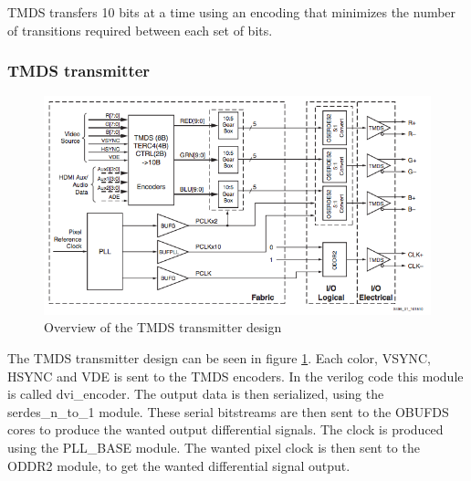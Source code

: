 TMDS transfers 10 bits at a time using an encoding that minimizes the number of transitions required between each set of bits.

\subsubsection{TMDS transmitter}
\begin{figure}[h!]
    \centering
    \includegraphics[width=\linewidth]{img/TMDStransmitterdesign.png}
    \caption{Overview of the TMDS transmitter design}
    \label{fig:TMDSTransmitter}
\end{figure}
The TMDS transmitter design can be seen in figure \ref{fig:TMDSTransmitter}.
Each color, VSYNC, HSYNC and VDE is sent to the TMDS encoders.
In the verilog code this module is called dvi\_encoder.
The output data is then serialized, using the serdes\_n\_to\_1 module.
These serial bitstreams are then sent to the OBUFDS cores to produce the wanted output differential signals.
The clock is produced using the PLL\_BASE module.
The wanted pixel clock is then sent to the ODDR2 module, to get the wanted differential signal output.

